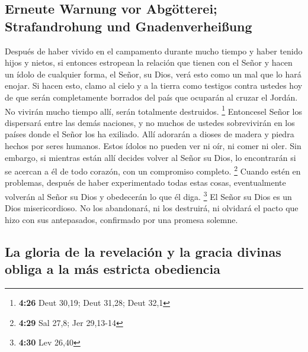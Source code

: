 \hypertarget{erneute-warnung-vor-abguxf6tterei-strafandrohung-und-gnadenverheiuxdfung}{%
\subsection{Erneute Warnung vor Abgötterei; Strafandrohung und
Gnadenverheißung}\label{erneute-warnung-vor-abguxf6tterei-strafandrohung-und-gnadenverheiuxdfung}}

 Después de haber vivido en el campamento durante mucho
tiempo y haber tenido hijos y nietos, si entonces estropean la relación
que tienen con el Señor y hacen un ídolo de cualquier forma, el Señor,
su Dios, verá esto como un mal que lo hará enojar.  Si
hacen esto, clamo al cielo y a la tierra como testigos contra ustedes
hoy de que serán completamente borrados del país que ocuparán al cruzar
el Jordán. No vivirán mucho tiempo allí, serán totalmente destruidos.
\footnote{\textbf{4:26} Deut 30,19; Deut 31,28; Deut 32,1}
 Entoncesel Señor los dispersará entre las demás
naciones, y no muchos de ustedes sobrevivirán en los países donde el
Señor los ha exiliado.  Allí adorarán a dioses de madera
y piedra hechos por seres humanos. Estos ídolos no pueden ver ni oír, ni
comer ni oler.  Sin embargo, si mientras están allí
decides volver al Señor su Dios, lo encontrarán si se acercan a él de
todo corazón, con un compromiso completo. \footnote{\textbf{4:29} Sal
  27,8; Jer 29,13-14}  Cuando estén en problemas, después
de haber experimentado todas estas cosas, eventualmente volverán al
Señor su Dios y obedecerán lo que él diga. \footnote{\textbf{4:30} Lev
  26,40}  El Señor su Dios es un Dios misericordioso. No
los abandonará, ni los destruirá, ni olvidará el pacto que hizo con sus
antepasados, confirmado por una promesa solemne.

\hypertarget{la-gloria-de-la-revelaciuxf3n-y-la-gracia-divinas-obliga-a-la-muxe1s-estricta-obediencia}{%
\subsection{La gloria de la revelación y la gracia divinas obliga a la
más estricta
obediencia}\label{la-gloria-de-la-revelaciuxf3n-y-la-gracia-divinas-obliga-a-la-muxe1s-estricta-obediencia}}

